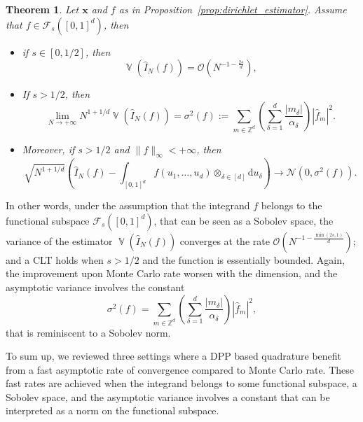 \documentclass[twoside,11pt]{book}
\newtheorem{theorem}{Theorem}
\DeclareMathOperator{\Var}{\mathbb{V}}
\begin{document}
\begin{theorem}
Let $\bm{x}$ and $f$ as in Proposition~\ref{prop:dirichlet_estimator}. Assume that $f \in \mathcal{F}_{s}([0,1]^{d})$, then
\begin{itemize}
\item if $s \in [0,1/2]$, then 
\begin{equation}
\Var (\hat{I}_{N}(f))  = \mathcal{O}(N^{-1-\frac{2s}{d}}),
\end{equation}
\item If $s>1/2$, then
\begin{equation}
\lim\limits_{N \rightarrow +\infty} N^{1+1/d} \Var (\hat{I}_{N}(f)) = \sigma^{2}(f) := \sum\limits_{m \in \mathbb{Z}^{d}}(\sum\limits_{\delta = 1}^{d} \frac{|m_{\delta}|}{\alpha_{\delta}} ) |\hat{f}_{m}|^{2}.
\end{equation}
\item Moreover, if $s>1/2$ and $ \|f\|_{\infty} < +\infty$, then
\begin{equation}
\sqrt{N^{1+1/d}} \left(\hat{I}_{N}(f) - \int_{[0,1]^{d}} f(u_{1}, \dots, u_{d}) \otimes_{\delta \in [d]} \mathrm{d}u_{\delta} \right) \rightarrow \mathcal{N}(0,\sigma^{2}(f)).
\end{equation}
\end{itemize}

\end{theorem}

In other words, under the assumption that the integrand $f$ belongs to the functional subspace $\mathcal{F}_{s}([0,1]^{d})$, that can be seen as a Sobolev space, the variance of the estimator $\Var (\hat{I}_{N}(f))$ converges at the rate $\mathcal{O}(N^{-1-\frac{\min(2s,1)}{d}})$; and a CLT holds when $s>1/2$ and the function is essentially bounded. Again, the improvement upon Monte Carlo rate worsen with the dimension, and the asymptotic variance involves the constant 
\begin{equation}
\sigma^{2}(f) = \sum\limits_{m \in \mathbb{Z}^{d}}(\sum\limits_{\delta = 1}^{d} \frac{|m_{\delta}|}{\alpha_{\delta}} ) |\hat{f}_{m}|^{2},
\end{equation}
that is reminiscent to a Sobolev norm.


To sum up, we reviewed three settings where a DPP based quadrature benefit from a fast asymptotic rate of convergence compared to  Monte Carlo rate. These fast rates are achieved when the integrand belongs to some functional subspace, a Sobolev space, and the asymptotic variance involves a constant that can be interpreted as a norm on the functional subspace.
\end{document}
